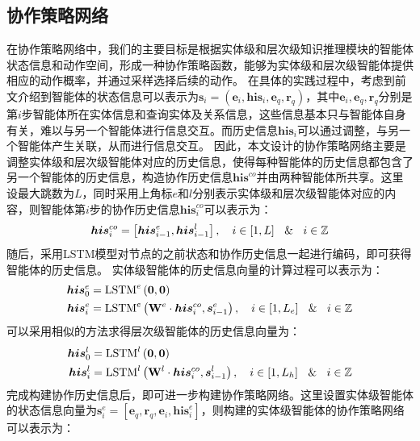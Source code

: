 \documentclass[algorithmlist, AutoFakeBold, AutoFakeSlant, figurelist, tablelist, nomlist, engineering]{seuthesix}
\begin{document}
\subsection{协作策略网络}
在协作策略网络中，我们的主要目标是根据实体级和层次级知识推理模块的智能体状态信息和动作空间，形成一种协作策略函数，能够为实体级和层次级智能体提供相应的动作概率，并通过采样选择后续的动作。
在具体的实践过程中，考虑到前文介绍到智能体的状态信息可以表示为$\bm{s}_i = (\bm{e}_i, \bm{his}_i, \bm{e}_q, \bm{r}_q)$，其中$\bm{e}_i, \bm{e}_q, \bm{r}_q$分别是第$i$步智能体所在实体信息和查询实体及关系信息，这些信息基本只与智能体自身有关，难以与另一个智能体进行信息交互。而历史信息$\bm{his}_i$可以通过调整，与另一个智能体产生关联，从而进行信息交互。
因此，本文设计的协作策略网络主要是调整实体级和层次级智能体对应的历史信息，使得每种智能体的历史信息都包含了另一个智能体的历史信息，构造协作历史信息$\bm{his}^{co}$并由两种智能体所共享。这里设最大跳数为$L$，同时采用上角标$e$和$l$分别表示实体级和层次级智能体对应的内容，则智能体第$i$步的协作历史信息$\bm{his}_i^{co}$可以表示为：
\begin{equation}
  \bm{his}_{i}^{co} = \left[\bm{his}_{i-1}^e, \bm{his}_{i-1}^l\right], \quad i \in [1, L] \  \And \  i \in \mathbb{Z}
  \label{his_1}
\end{equation}
随后，采用LSTM模型对节点的之前状态和协作历史信息一起进行编码，即可获得智能体的历史信息。
实体级智能体的历史信息向量的计算过程可以表示为：
\begin{equation}
  \begin{aligned}
    \bm{his}_0^e &= \operatorname{LSTM}^e\left(\bm{0}, \bm{0}\right) \\
    \bm{his}_i^e &= \operatorname{LSTM}^e\left(\mathbf{W}^e \cdot \bm{his}_i^{co}, \bm{s}_{i-1}^e\right),\quad i \in [1, L_e] \  \And \  i \in \mathbb{Z}
  \end{aligned}
  \label{his_2}
\end{equation}
可以采用相似的方法求得层次级智能体的历史信息向量为：
\begin{equation}
  \begin{aligned}
    \bm{his}_0^l &=\operatorname{LSTM}^l\left(\bm{0}, \bm{0}\right) \\
    \bm{his}_i^l &= \operatorname{LSTM}^l\left(\mathbf{W}^l \cdot \bm{his}_i^{co}, \bm{s}_{i-1}^l\right),\quad i \in [1, L_h] \  \And \  i \in \mathbb{Z}
  \end{aligned}
  \label{his_3}
\end{equation}
完成构建协作历史信息后，即可进一步构建协作策略网络。这里设置实体级智能体的状态信息向量为$\bm{s}_i^{e} = \left[\bm{e}_q, \bm{r}_q, \bm{e}_i, \bm{his}_i^e\right]$，则构建的实体级智能体的协作策略网络可以表示为：
\end{document}
